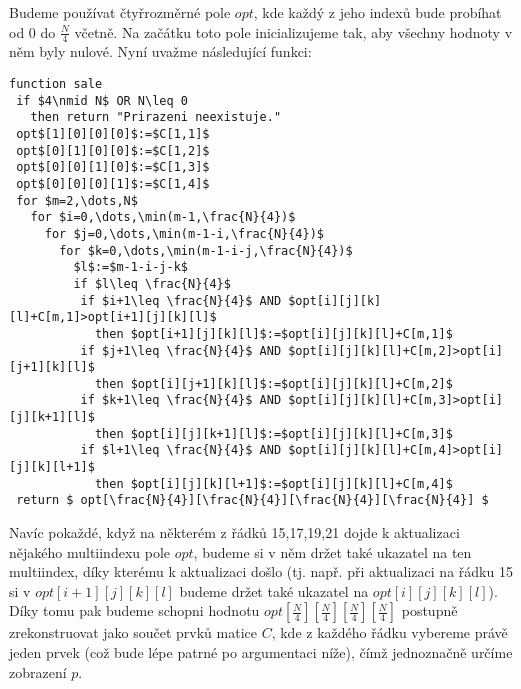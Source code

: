\documentclass[12pt,a4paper]{article}
\theoremstyle{plain}
\newcommand\addfunctions[1]{%
  \lstset{morekeywords=[4]{#1}}}
\begin{document}
\pagestyle{fancy}                      %
\fancyhf{}                             %
\addtolength{\topmargin}{-30 pt}                   %
\setlength{\headsep}{10 pt}                      %
\renewcommand{\headrulewidth}{1 pt}                %

Budeme používat čtyřrozměrné pole $opt$, kde každý z jeho indexů bude probíhat od $0$ do $\frac{N}{4}$ včetně. Na začátku toto pole inicializujeme tak, aby všechny hodnoty v něm byly nulové. Nyní uvažme následující funkci:

\begin{lstlisting}[mathescape]
function sale
 if $4\nmid N$ OR N\leq 0
   then return "Prirazeni neexistuje."
 opt$[1][0][0][0]$:=$C[1,1]$
 opt$[0][1][0][0]$:=$C[1,2]$
 opt$[0][0][1][0]$:=$C[1,3]$
 opt$[0][0][0][1]$:=$C[1,4]$   
 for $m=2,\dots,N$
   for $i=0,\dots,\min(m-1,\frac{N}{4})$
     for $j=0,\dots,\min(m-1-i,\frac{N}{4})$
       for $k=0,\dots,\min(m-1-i-j,\frac{N}{4})$
         $l$:=$m-1-i-j-k$
         if $l\leq \frac{N}{4}$
          if $i+1\leq \frac{N}{4}$ AND $opt[i][j][k][l]+C[m,1]>opt[i+1][j][k][l]$ 
            then $opt[i+1][j][k][l]$:=$opt[i][j][k][l]+C[m,1]$
          if $j+1\leq \frac{N}{4}$ AND $opt[i][j][k][l]+C[m,2]>opt[i][j+1][k][l]$ 
            then $opt[i][j+1][k][l]$:=$opt[i][j][k][l]+C[m,2]$
          if $k+1\leq \frac{N}{4}$ AND $opt[i][j][k][l]+C[m,3]>opt[i][j][k+1][l]$ 
            then $opt[i][j][k+1][l]$:=$opt[i][j][k][l]+C[m,3]$
          if $l+1\leq \frac{N}{4}$ AND $opt[i][j][k][l]+C[m,4]>opt[i][j][k][l+1]$ 
            then $opt[i][j][k][l+1]$:=$opt[i][j][k][l]+C[m,4]$     
 return $ opt[\frac{N}{4}][\frac{N}{4}][\frac{N}{4}][\frac{N}{4}] $
\end{lstlisting}

Navíc pokaždé, když na některém z řádků 15,17,19,21 dojde k aktualizaci nějakého multiindexu pole $opt$, budeme si v něm držet také ukazatel na ten multiindex, díky kterému k aktualizaci došlo (tj. např. při aktualizaci na řádku 15 si v $opt[i+1][j][k][l]$ budeme držet také ukazatel na $opt[i][j][k][l]$). Díky tomu pak budeme schopni hodnotu $ opt[\frac{N}{4}][\frac{N}{4}][\frac{N}{4}][\frac{N}{4}]$ postupně zrekonstruovat jako součet prvků matice $C$, kde z každého řádku vybereme právě jeden prvek (což bude lépe patrné po argumentaci níže), čímž jednoznačně určíme zobrazení $p$.\\
\end{document}
